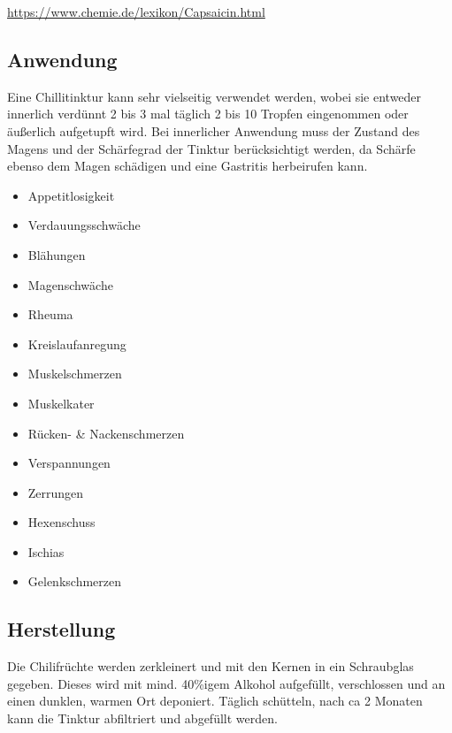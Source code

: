 \url{https://www.chemie.de/lexikon/Capsaicin.html}

                

\subsection{Anwendung}

Eine Chillitinktur kann sehr vielseitig verwendet werden, wobei sie entweder innerlich verdünnt 2 bis 3  mal täglich 2 bis 10 Tropfen eingenommen oder äußerlich aufgetupft wird. Bei innerlicher Anwendung muss der Zustand des Magens und der Schärfegrad der Tinktur berücksichtigt werden, da Schärfe ebenso dem Magen schädigen und eine Gastritis herbeirufen kann. 

\begin{itemize}
	\item Appetitlosigkeit
	\item Verdauungsschwäche
	\item Blähungen
	\item Magenschwäche
	\item Rheuma
	\item Kreislaufanregung
	\item Muskelschmerzen
	\item Muskelkater
	\item Rücken- \& Nackenschmerzen
	\item Verspannungen
	\item Zerrungen
	\item Hexenschuss
	\item Ischias
	\item Gelenkschmerzen 
\end{itemize}

\subsection{Herstellung}

Die Chilifrüchte werden zerkleinert und mit den Kernen in ein Schraubglas gegeben. Dieses wird mit mind. 40\%igem Alkohol aufgefüllt, verschlossen und an einen dunklen, warmen Ort deponiert. Täglich schütteln, nach ca 2 Monaten kann die Tinktur abfiltriert und abgefüllt werden.


